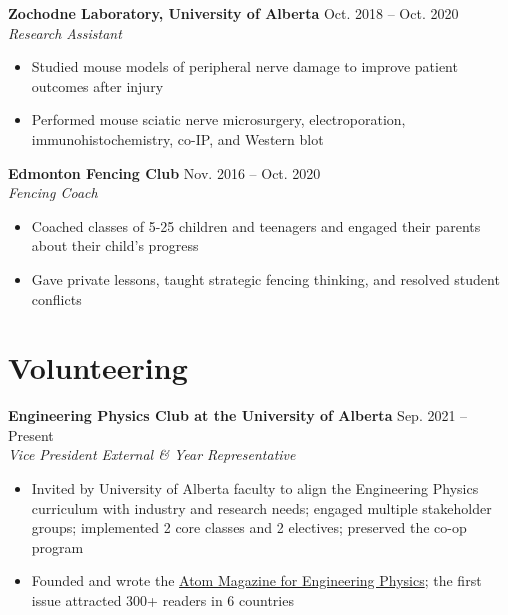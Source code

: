 \documentclass{article}
\begin{document}
\textbf{Zochodne Laboratory, University of Alberta} \hfill Oct. 2018 -- Oct. 2020 \\
\textit{Research Assistant}
\begin{itemize}
    \item Studied mouse models of peripheral nerve damage to improve patient outcomes after injury
    \item Performed mouse sciatic nerve microsurgery, electroporation, immunohistochemistry, co-IP, and Western blot
\end{itemize} \vspace{1em}

\textbf{Edmonton Fencing Club} \hfill Nov. 2016 -- Oct. 2020 \\
\textit{Fencing Coach}
\begin{itemize}
    \item Coached classes of 5-25 children and teenagers and engaged their parents about their child's progress
    \item Gave private lessons, taught strategic fencing thinking, and resolved student conflicts
\end{itemize}


\section*{\textcolor{my_colour}{Volunteering}}
\vspace{-.25em} \hrulefill \vspace{.25em}

\textbf{Engineering Physics Club at the University of Alberta} \hfill Sep. 2021 -- Present \\
\textit{Vice President External \& Year Representative}
\begin{itemize}
    \item Invited by University of Alberta faculty to align the Engineering Physics curriculum with industry and research needs; engaged multiple stakeholder groups; implemented 2 core classes and 2 electives; preserved the co-op program
    \item Founded and wrote the \href{https://atom-winter-2022.netlify.app/}{Atom Magazine for Engineering Physics}; the first issue attracted 300+ readers in 6 countries
\end{itemize} \vspace{1em}
\end{document}
